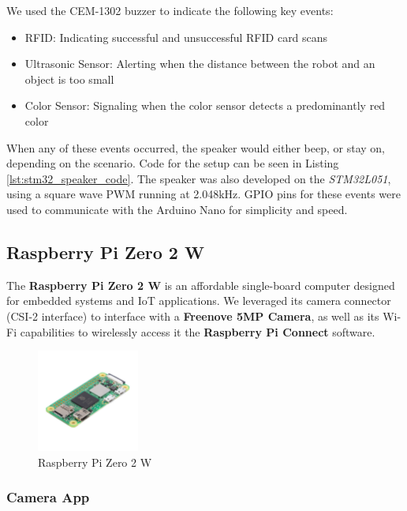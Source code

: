 \documentclass{article}
\begin{document}
We used the CEM-1302 buzzer to indicate the following key events:
\begin{itemize}
    \item RFID: Indicating successful and unsuccessful RFID card scans
    \item Ultrasonic Sensor: Alerting when the distance between the robot and an object is too small
    \item Color Sensor: Signaling when the color sensor detects a predominantly red color
\end{itemize}

When any of these events occurred, the speaker would either beep, or stay on, depending on the scenario. Code for the setup can be seen in Listing \ref{lst:stm32_speaker_code}. The speaker was also developed on the \emph{STM32L051}, using a square wave PWM running at 2.048kHz. GPIO pins for these events were used to communicate with the Arduino Nano for simplicity and speed.

\subsection{Raspberry Pi Zero 2 W}

The \textbf{Raspberry Pi Zero 2 W} is an affordable single-board computer designed for
embedded systems and IoT applications. We leveraged its camera connector (CSI-2 interface)
to interface with a \textbf{Freenove 5MP Camera}, as well as its Wi-Fi capabilities to
wirelessly access it the \textbf{Raspberry Pi Connect} software.

\begin{figure}[H]
    \centering
    \includegraphics[width=0.3\textwidth]{Figures/PiZero_2.jpg}
    \caption{Raspberry Pi Zero 2 W}
    \label{fig:raspberrypi}
\end{figure}

\subsubsection{Camera App}
\end{document}
